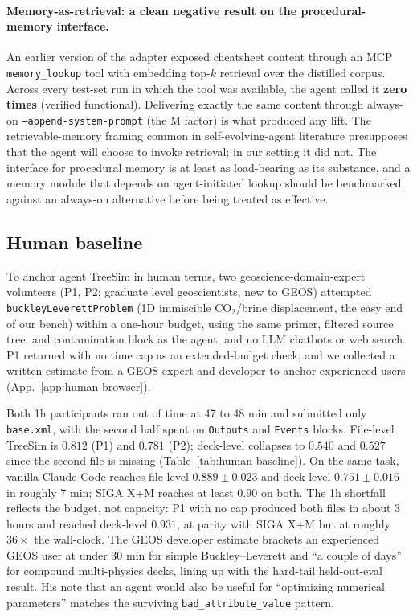\documentclass{article}
\begin{document}
\paragraph{Memory-as-retrieval: a clean negative result on the procedural-memory interface.}\label{subsec:memory-negative} An earlier version of the adapter exposed cheatsheet content through an MCP \texttt{memory\_lookup} tool with embedding top-$k$ retrieval over the distilled corpus. Across every test-set run in which the tool was available, the agent called it \textbf{zero times} (verified functional). Delivering exactly the same content through always-on \texttt{--append-system-prompt} (the M factor) is what produced any lift. The retrievable-memory framing common in self-evolving-agent literature presupposes that the agent will choose to invoke retrieval; in our setting it did not. The interface for procedural memory is at least as load-bearing as its substance, and a memory module that depends on agent-initiated lookup should be benchmarked against an always-on alternative before being treated as effective.

\subsection{Human baseline}
\label{subsec:human-baseline}

To anchor agent TreeSim in human terms, two geoscience-domain-expert volunteers (P1, P2; graduate level geoscientists, new to GEOS) attempted \texttt{buckleyLeverettProblem} (1D immiscible CO$_2$/brine displacement, the easy end of our bench) within a one-hour budget, using the same primer, filtered source tree, and contamination block as the agent, and no LLM chatbots or web search. P1 returned with no time cap as an extended-budget check, and we collected a written estimate from a GEOS expert and developer to anchor experienced users (App.~\ref{app:human-browser}).

Both 1h participants ran out of time at 47 to 48 min and submitted only \texttt{base.xml}, with the second half spent on \texttt{Outputs} and \texttt{Events} blocks. File-level TreeSim is $0.812$ (P1) and $0.781$ (P2); deck-level collapses to $0.540$ and $0.527$ since the second file is missing (Table~\ref{tab:human-baseline}). On the same task, vanilla Claude Code reaches file-level $0.889 \pm 0.023$ and deck-level $0.751 \pm 0.016$ in roughly 7 min; SIGA X+M reaches at least $0.90$ on both. The 1h shortfall reflects the budget, not capacity: P1 with no cap produced both files in about 3 hours and reached deck-level $\mathbf{0.931}$, at parity with SIGA X+M but at roughly $36\times$ the wall-clock. The GEOS developer estimate brackets an experienced GEOS user at under 30 min for simple Buckley--Leverett and ``a couple of days'' for compound multi-physics decks, lining up with the hard-tail held-out-eval result. His note that an agent would also be useful for ``optimizing numerical parameters'' matches the surviving \texttt{bad\_attribute\_value} pattern.
\end{document}
